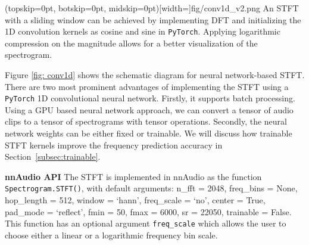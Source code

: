 \documentclass{ieeeaccess}
\newcommand{\nbh}[1]{\texttt{#1}}
\begin{document}


\Figure[t!](topskip=0pt, botskip=0pt, midskip=0pt)[width=\linewidth]{fig/conv1d_v2.png}
{An STFT with a sliding window can be achieved by implementing DFT and initializing the 1D convolution kernels as cosine and sine in \nbh{PyTorch}. Applying logarithmic compression on the magnitude allows for a better visualization of the spectrogram. \label{fig: conv1d}}





Figure \ref{fig: conv1d} shows the schematic diagram for neural network-based STFT. There are two most prominent advantages of implementing the STFT using a \nbh{PyTorch} 1D convolutional neural network. Firstly, it supports batch processing. Using a GPU based neural network approach, we can convert a tensor of audio clips to a tensor of spectrograms with tensor operations. Secondly, the neural network weights can be either fixed or trainable. We will discuss how trainable STFT kernels improve the frequency prediction accuracy in Section~\ref{subsec:trainable}. 

\hspace{11pt} 

\noindent \textbf{nnAudio API} The STFT is implemented in nnAudio as the function \nbh{Spectrogram.STFT()}, with default arguments: n\_fft = 2048, freq\_bins = None, hop\_length = 512, window = `hann', freq\_scale = `no', center = True, pad\_mode = `reflect', fmin = 50, fmax = 6000, sr = 22050, trainable = False. This function has an optional argument \nbh{freq\_scale} which allows the user to choose either a linear or a logarithmic frequency bin scale.
\end{document}
